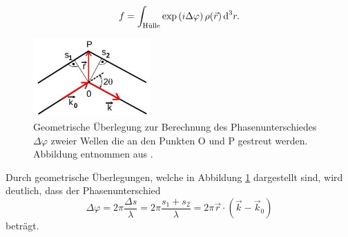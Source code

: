 \begin{equation}
  f=\int_\text{Hülle}\exp\left(i\Delta\varphi\right)\rho(\vec r)\,\text{d}^3r.
\end{equation}
\begin{figure}
\includegraphics[width=0.4\textwidth]{abb8.jpg}
\caption{Geometrische Überlegung zur Berechnung des Phasenunterschiedes $\Delta \varphi$ zweier Wellen die an den Punkten O und P gestreut werden. Abbildung entnommen aus \cite{V41}.}
\label{abb:8}
\end{figure}
Durch geometrische Überlegungen, welche in Abbildung \ref{abb:8} dargestellt sind, wird deutlich, dass der Phasenunterschied
\begin{equation}
  \label{eq:7}
  \Delta \varphi=2\pi \frac{\Delta s}{\lambda}=2\pi \frac{s_1+s_2}{\lambda}=2\pi\vec r \cdot \left(\vec k- \vec k_0\right)
\end{equation}
beträgt. 
